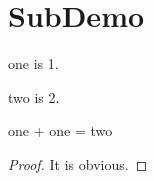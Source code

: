 \section{SubDemo}
\label{sec:subdemo}

\begin{definition}[One]
\label{one}
\leanok

  one is 1.

\end{definition}

\begin{definition}[Two]
\label{two}
\leanok

    two is 2.

\end{definition}

\begin{lemma}
\label{one_plus_one_eq_two}
\leanok

one + one = two

\end{lemma}

\begin{proof}
It is obvious.
\end{proof}